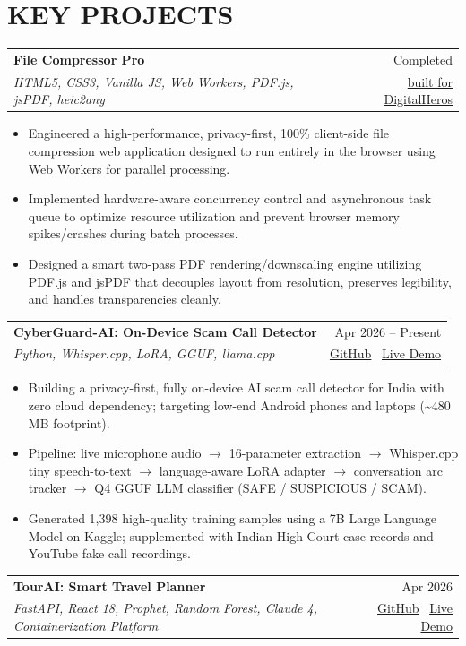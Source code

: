 \documentclass[11pt,letterpaper]{article}
\newcommand{\resumeProjectHeading}[4]{
\vspace{2pt}
\begin{tabularx}{\textwidth}{X r}
\textbf{#1} & #2 \\
\textit{#3} & #4
\end{tabularx}
\vspace{-3pt}
}
\newcommand{\resumeItem}[1]{
\item #1
}
\newcommand{\resumeItemListStart}{
\begin{itemize}[leftmargin=0.22in,itemsep=1pt,topsep=2pt]
}
\newcommand{\resumeItemListEnd}{
\end{itemize}
}
\begin{document}


\section{KEY PROJECTS}

\resumeProjectHeading
{File Compressor Pro}
{Completed}
{HTML5, CSS3, Vanilla JS, Web Workers, PDF.js, jsPDF, heic2any}
{\href{https://digitalheroesco.com/}{built for DigitalHeros}}

\resumeItemListStart
\resumeItem{Engineered a high-performance, privacy-first, 100\% client-side file compression web application designed to run entirely in the browser using Web Workers for parallel processing.}
\resumeItem{Implemented hardware-aware concurrency control and asynchronous task queue to optimize resource utilization and prevent browser memory spikes/crashes during batch processes.}
\resumeItem{Designed a smart two-pass PDF rendering/downscaling engine utilizing PDF.js and jsPDF that decouples layout from resolution, preserves legibility, and handles transparencies cleanly.}
\resumeItemListEnd

\vspace{4pt}

\resumeProjectHeading
{CyberGuard-AI: On-Device Scam Call Detector}
{Apr 2026 -- Present}
{Python, Whisper.cpp, LoRA, GGUF, llama.cpp}
{\href{https://github.com/your-github-link}{GitHub} \textbar\ \href{https://your-live-demo-link.com}{Live Demo}}

\resumeItemListStart
\resumeItem{Building a privacy-first, fully on-device AI scam call detector for India with zero cloud dependency; targeting low-end Android phones and laptops (\textasciitilde480 MB footprint).}
\resumeItem{Pipeline: live microphone audio $\rightarrow$ 16-parameter extraction $\rightarrow$ Whisper.cpp tiny speech-to-text $\rightarrow$ language-aware LoRA adapter $\rightarrow$ conversation arc tracker $\rightarrow$ Q4 GGUF LLM classifier (SAFE / SUSPICIOUS / SCAM).}
\resumeItem{Generated 1,398 high-quality training samples using a 7B Large Language Model on Kaggle; supplemented with Indian High Court case records and YouTube fake call recordings.}
\resumeItemListEnd

\vspace{4pt}

\resumeProjectHeading
{TourAI: Smart Travel Planner}
{Apr 2026}
{FastAPI, React 18, Prophet, Random Forest, Claude 4, Containerization Platform}
{\href{https://github.com/your-github-link}{GitHub} \textbar\ \href{https://your-live-demo-link.com}{Live Demo}}
\end{document}
